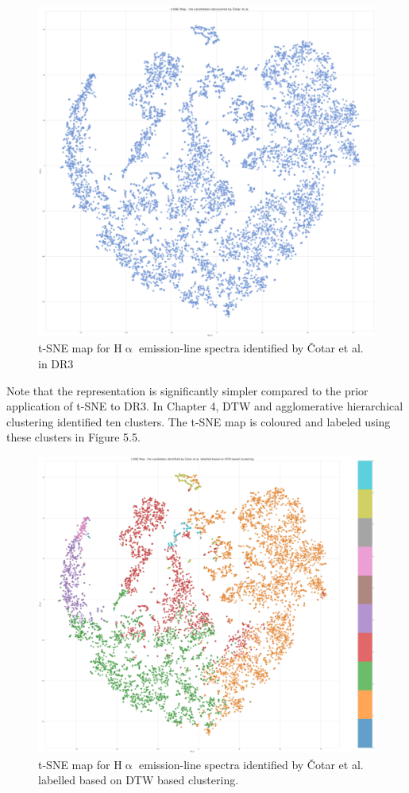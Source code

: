 \begin{figure}[!htb]
\centering
\includegraphics[scale=0.12]{figures/t-sne cotar et al.png}
\caption{t-SNE map for H$\upalpha$ emission-line spectra identified by Čotar et al. in DR3}
\end{figure}

Note that the representation is significantly simpler compared to the prior application of t-SNE to DR3. In Chapter 4, DTW and agglomerative hierarchical clustering identified ten clusters. The t-SNE map is coloured and labeled using these clusters in Figure 5.5.

\begin{figure}[!htb]
\centering
\includegraphics[scale=0.16]{figures/t-sne colored by dtw.png}
\caption{t-SNE map for H$\upalpha$ emission-line spectra identified by Čotar et al. labelled based on DTW based clustering.}
\label{fig5.5}
\end{figure}

